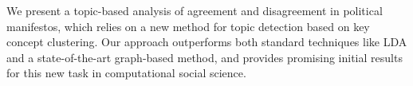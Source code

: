 We present a topic-based analysis of agreement and disagreement in political manifestos, which relies on a new method for topic detection based on key concept  clustering. Our approach outperforms both standard techniques like LDA and a state-of-the-art graph-based method, and provides promising initial results for this new task in computational social science.
